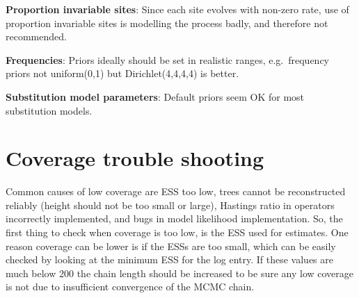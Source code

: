 \documentclass[oneside]{article}
\begin{document}
{\bf Proportion invariable sites}\label{proportion-invariable-sites}:
Since each site evolves with non-zero rate, use of proportion invariable
sites is modelling the process badly, and therefore not recommended.

{\bf Frequencies}\label{frequencies}:
Priors ideally should be set in realistic ranges, e.g.~frequency priors
not uniform(0,1) but Dirichlet(4,4,4,4) is better.

{\bf Substitution model parameters}\label{substitution-model-parameters}:
Default priors seem OK for most substitution models.

\section{Coverage trouble shooting}\label{trouble-shooting}







Common causes of low coverage are ESS too low,
trees cannot be reconstructed reliably (height should not be too small or large),
Hastings ratio in operators incorrectly implemented, and
bugs in model likelihood implementation.
So, the first thing to check when coverage is too low, is the ESS used for
estimates.
One reason coverage can be lower is if the ESSs are too small, which can
be easily checked by looking at the minimum ESS for the log entry. If
these values are much below 200 the chain length should be increased to
be sure any low coverage is not due to insufficient convergence of the
MCMC chain.




\vspace{1cm}


\vspace{1cm}

\end{document}
